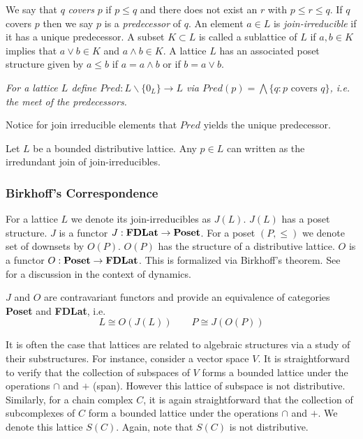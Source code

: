 We say that $q$ {\em covers} $p$ if $p\leq q$ and there does not exist an $r$ with $p\leq r \leq q$.  If $q$ covers $p$ then we say $p$ is a {\em predecessor} of $q$.  An element $a\in L$ is {\em join-irreducible} if it has a unique predecessor.   A subset $K\subset L$ is called a sublattice of $L$ if $a,b\in K$ implies that $a\vee b\in K$ and $a\wedge b\in K$.  A lattice $L$ has an associated poset structure given by $a\leq b$ if $a=a\wedge b$ or if $b=a\vee b$.

\begin{defn}
{\em
For a lattice $L$ define $Pred:L\backslash \{0_L\} \to L$ via $Pred(p) = \bigwedge \{q: \text{$p$ covers $q$}\}$, i.e. the meet of the predecessors.
}
\end{defn}

 Notice for join irreducible elements that $Pred$ yields the unique predecessor.

\begin{lem}\label{lem:join}
Let $L$ be a bounded distributive lattice.  Any $p\in L$ can written as the irredundant join of join-irreducibles.
\end{lem}


\subsubsection{Birkhoff's Correspondence}

For a lattice $L$ we denote its join-irreducibles as $J(L)$.  $J(L)$ has a poset structure.  $J$ is a functor $J:{\bf FDLat}\to {\bf Poset}$.  For a poset $(P,\leq)$ we denote set of downsets by $O(P)$. $O(P)$ has the structure of a distributive lattice.  $O$ is a functor $O:{\bf Poset}\to {\bf FDLat}$.  This is formalized via Birkhoff's theorem.  See~\cite{lsa,lsa2,salamon} for a discussion in the context of dynamics.

\begin{thm}\label{thm:birkhoff}
$J$ and $O$ are contravariant functors and provide an equivalence of categories {\bf Poset} and {\bf FDLat}, i.e. $$L\cong O(J(L))\quad\quad P\cong J(O(P))$$

\end{thm}

It is often the case that lattices are related to algebraic structures via a study of their substructures.  For instance, consider a vector space $V$.  It is straightforward to verify that the collection of subspaces of $V$ forms a bounded lattice under the operations $\cap$ and $+$ (span). However this lattice of subspace is not distributive.  Similarly, for a chain complex $C$, it is again straightforward that the collection of subcomplexes of $C$ form a bounded lattice under the operations $\cap$ and $+$.  We denote this lattice $S(C)$.  Again, note that $S(C)$ is not distributive.









